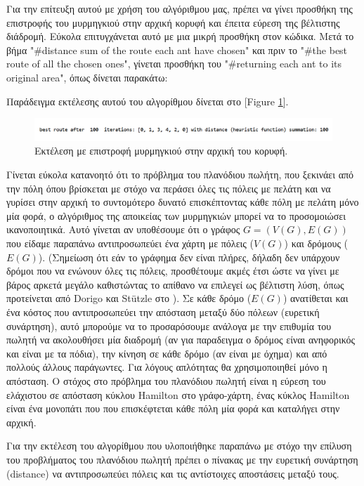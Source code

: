 Για την επίτευξη αυτού με χρήση του αλγόριθμου μας, πρέπει να γίνει προσθήκη της επιστροφής του μυρμηγκιού στην αρχική κορυφή και έπειτα εύρεση της βέλτιστης διάδρομή. Εύκολα επιτυγχάνεται αυτό με μια μικρή προσθήκη στον κώδικα. Μετά το βήμα "\#distance sum of the route each ant have chosen" και πριν το "\#the best route of all the chosen ones", γίνεται προσθήκη του "\#returning each ant to its original area", όπως δίνεται παρακάτω:

Παράδειγμα εκτέλεσης αυτού του αλγορίθμου δίνεται στο [Figure \ref{exret}].
\begin{figure}
    \centering
    \includegraphics[scale=0.55]{2947_thesis/pictures/ex7.png} 
    \caption{Εκτέλεση με επιστροφή μυρμηγκιού στην αρχική του κορυφή.}
    \label{exret}
\end{figure}

Γίνεται εύκολα κατανοητό ότι το πρόβλημα του πλανόδιου πωλήτη, που ξεκινάει από την πόλη όπου βρίσκεται με στόχο να περάσει όλες τις πόλεις με πελάτη και να γυρίσει στην αρχική το συντομότερο δυνατό επισκέπτοντας κάθε πόλη με πελάτη μόνο μία φορά, ο αλγόριθμος της αποικείας των μυρμηγκιών μπορεί να το προσομοιώσει ικανοποιητικά. 
Αυτό γίνεται αν υποθέσουμε ότι ο γράφος $G=(V(G), E(G))$  που είδαμε παραπάνω αντιπροσωπεύει ένα χάρτη με πόλεις ($V(G)$) και δρόμους ($E(G)$). (Σημείωση ότι εάν το γράφημα δεν είναι πλήρες, δήλαδη δεν υπάρχουν δρόμοι που να ενώνουν όλες τις πόλεις, προσθέτουμε ακμές έτσι ώστε να γίνει με βάρος αρκετά μεγάλο καθιστώντας το απίθανο να επιλεγεί ως βέλτιστη λύση, όπως προτείνεται από Dorigo και Stützle στο \cite{Dorigo-Stützle2}). Σε κάθε δρόμο ($E(G)$) ανατίθεται και ένα κόστος που αντιπροσωπεύει την απόσταση μεταξύ δύο πόλεων (ευρετική συνάρτηση), αυτό μπορούμε να το προσαρόσουμε ανάλογα με την επιθυμία του πωλητή να ακολουθήσει μία διαδρομή (αν για παραδειγμα ο δρόμος είναι ανηφορικός και είναι με τα πόδια), την κίνηση σε κάθε δρόμο (αν είναι με όχημα) και από πολλούς άλλους παράγωντες. Για λόγους απλότητας θα χρησιμοποιηθεί μόνο η απόσταση. Ο στόχος στο πρόβλημα του πλανόδιου πωλητή είναι η εύρεση του ελάχιστου σε απόσταση κύκλου Hamilton στο γράφο-χάρτη, ένας κύκλος Hamilton είναι ένα μονοπάτι που που επισκέφτεται κάθε πόλη μία φορά και καταλήγει στην αρχική. \cite{Dorigo-Stützle2}

Για την εκτέλεση του αλγορίθμου που υλοποιήθηκε παραπάνω με στόχο την επίλυση του προβλήματος του πλανόδιου πωλητή πρέπει ο πίνακας με την ευρετική συνάρτηση (distance) να αντιπροσωπεύει πόλεις και τις αντίστοιχες αποστάσεις μεταξύ τους. 





